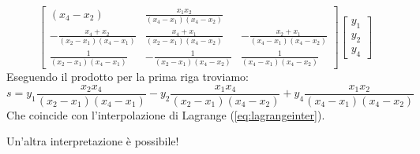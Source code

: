 \begin{example}
\[\begin{bmatrix}
{  (x_4 - x_2)} & \frac{x_1 x_2}{(x_4 - x_1)  (x_4 - x_2)}\\
  - \frac{x_4 + x_2}{(x_2 - x_1)  (x_4 - x_1)} & \frac{x_4 + x_1}{(x_2 - x_1) 
  (x_4 - x_2)} & - \frac{x_2 + x_1}{(x_4 - x_1)  (x_4 - x_2)}\\
  \frac{1}{(x_2 - x_1)  (x_4 - x_1)} & - \frac{1}{(x_2 - x_1)  (x_4 - x_2)} &
  \frac{1}{(x_4 - x_1)  (x_4 - x_2)}
\end{bmatrix}
\begin{bmatrix}
    y_1\\
    y_2\\
    y_4
\end{bmatrix}
\]
Eseguendo il prodotto per la prima riga troviamo:
\[s=y_1\frac{ x_2 x_4}{(x_2 - x_1)  (x_4 - x_1)} - y_2\frac{x_1  x_4}{(x_2 - x_1)
(x_4 - x_2)} + y_4\frac{x_1 x_2 }{(x_4 - x_1)  (x_4 - x_2)} \]
Che coincide con l'interpolazione di Lagrange (\cref{eq:lagrangeinter}).
\end{example}
\begin{remark}
Un'altra interpretazione è possibile!
\end{remark}

